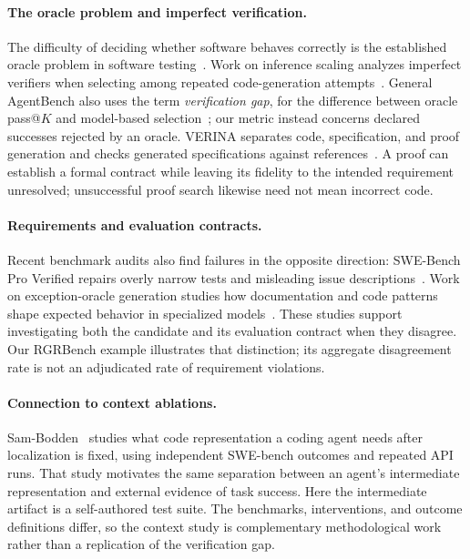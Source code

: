 \paragraph{The oracle problem and imperfect verification.}
The difficulty of deciding whether software behaves correctly is the established oracle
problem in software testing~\cite{barr2015oracle}. Work on inference scaling analyzes
imperfect verifiers when selecting among repeated code-generation attempts~\cite{stroebl2026resampling}.
General AgentBench also uses the term \emph{verification gap}, for the difference between
oracle pass@$K$ and model-based selection~\cite{li2026generalagentbench}; our metric
instead concerns declared successes rejected by an oracle. VERINA separates code,
specification, and proof generation and checks generated specifications against references~\cite{ye2026verina}.
A proof can establish a formal contract while leaving its fidelity to the intended
requirement unresolved; unsuccessful proof search likewise need not mean incorrect code.

\paragraph{Requirements and evaluation contracts.}
Recent benchmark audits also find failures in the opposite direction: SWE-Bench Pro
Verified repairs overly narrow tests and misleading issue descriptions~\cite{zheng2026sweproverified}.
Work on exception-oracle generation studies how documentation and code patterns shape
expected behavior in specialized models~\cite{hossain2026exceptionpatterns}. These studies support investigating
both the candidate and its evaluation contract when they disagree. Our RGRBench example
illustrates that distinction; its aggregate disagreement rate is not an adjudicated
rate of requirement violations.

\paragraph{Connection to context ablations.}
Sam-Bodden~\cite{sambodden2026context} studies what code representation a coding agent needs
after localization is fixed, using independent SWE-bench outcomes and repeated API runs.
That study motivates the same separation between an agent's intermediate representation and
external evidence of task success. Here the intermediate artifact is a self-authored test
suite. The benchmarks, interventions, and outcome definitions differ, so the context study
is complementary methodological work rather than a replication of the verification gap.


